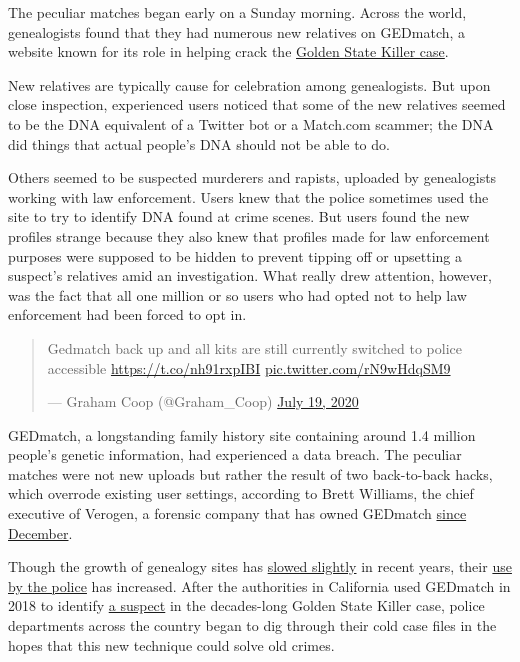 The peculiar matches began early on a Sunday morning. Across the world,
genealogists found that they had numerous new relatives on GEDmatch, a
website known for its role in helping crack the
\href{https://www.nytimes.com/2020/06/29/us/golden-state-killer-joseph-deangelo.html}{Golden
State Killer case}.

New relatives are typically cause for celebration among genealogists.
But upon close inspection, experienced users noticed that some of the
new relatives seemed to be the DNA equivalent of a Twitter bot or a
Match.com scammer; the DNA did things that actual people's DNA should
not be able to do.

Others seemed to be suspected murderers and rapists, uploaded by
genealogists working with law enforcement. Users knew that the police
sometimes used the site to try to identify DNA found at crime scenes.
But users found the new profiles strange because they also knew that
profiles made for law enforcement purposes were supposed to be hidden to
prevent tipping off or upsetting a suspect's relatives amid an
investigation. What really drew attention, however, was the fact that
all one million or so users who had opted not to help law enforcement
had been forced to opt in.

\begin{quote}
Gedmatch back up and all kits are still currently switched to police
accessible \url{https://t.co/nh91rxpIBI}
\href{https://t.co/rN9wHdqSM9}{pic.twitter.com/rN9wHdqSM9}

--- Graham Coop (@Graham\_Coop)
\href{https://twitter.com/Graham_Coop/status/1284882121014702080?ref_src=twsrc\%5Etfw}{July
19, 2020}
\end{quote}

GEDmatch, a longstanding family history site containing around 1.4
million people's genetic information, had experienced a data breach. The
peculiar matches were not new uploads but rather the result of two
back-to-back hacks, which overrode existing user settings, according to
Brett Williams, the chief executive of Verogen, a forensic company that
has owned GEDmatch
\href{https://slate.com/technology/2019/12/gedmatch-verogen-genetic-genealogy-law-enforcement.html}{since
December}.

Though the growth of genealogy sites has
\href{https://www.cnbc.com/2020/01/23/23andme-lays-off-100-people-ceo-anne-wojcicki-explains-why.html}{slowed
slightly} in recent years, their
\href{https://www.nytimes.com/2019/04/25/us/golden-state-killer-dna.html}{use
by the police} has increased. After the authorities in California used
GEDmatch in 2018 to identify
\href{https://www.nytimes.com/2018/04/26/us/joseph-james-deangelo.html}{a
suspect} in the decades-long Golden State Killer case, police
departments across the country began to dig through their cold case
files in the hopes that this new technique could solve old crimes.


